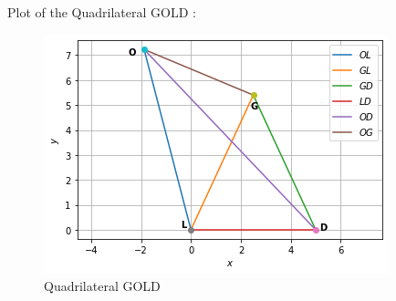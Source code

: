 \documentclass[journal,12pt,twocolumn]{IEEEtran}
\begin{document}
\begin{enumerate}
Plot of the Quadrilateral GOLD :
\begin{figure}[ht]
    \centering
    \includegraphics[width=\columnwidth]{GOLDfig.png}
    \caption{Quadrilateral GOLD}
    \label{fig:Quadrilateral GOLD}
\end{figure}
\end{enumerate}
\end{document}
